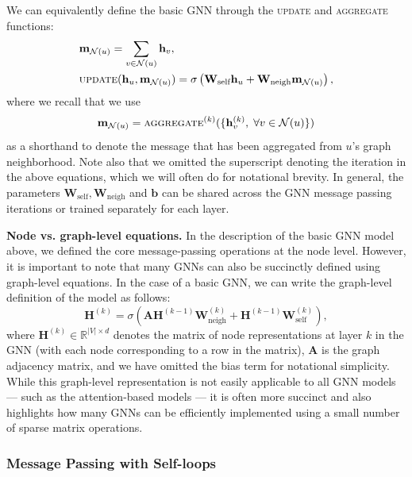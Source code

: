 \documentclass[10pt]{book}
\begin{document}
We can equivalently define the basic GNN through the \textsc{update} and \textsc{aggregate} functions:
\begin{align}
    &\mathbf m_{\mathcal N(u)} = \sum_{v \in \mathcal N(u)} \mathbf h_v, 
    \label{eq:basicgnn} \\
    &\textsc{update}(\mathbf h_u, \mathbf m_{\mathcal N(u)}) = \sigma \left( \mathbf W_\text{self} \mathbf h_u + \mathbf W_\text{neigh} \mathbf m_{\mathcal N(u)} \right),
\end{align}
where we recall that we use
\begin{equation}
    \mathbf m_{\mathcal N(u)} = \textsc{aggregate}^{(k)}(\{ \mathbf h_v^{(k)}, \; \forall v \in \mathcal N(u)\})
\end{equation}
as a shorthand to denote the message that has been aggregated from $u$'s graph neighborhood. Note also that we omitted the superscript denoting the iteration in the above equations, which we will often do for notational brevity. In general, the parameters $\mathbf W_\text{self}, \mathbf W_\text{neigh}$ and $\mathbf b$ can be shared across the GNN message passing iterations or trained separately for each layer.

\textbf{Node vs. graph-level equations.} In the description of the basic GNN model above, we defined the core message-passing operations at the node level. However, it is important to note that many GNNs can also be succinctly defined using graph-level equations. In the case of a basic GNN, we can write the graph-level definition of the model as follows:
\begin{equation}
    \mathbf H^{(k)} = \sigma \left( \mathbf A \mathbf H^{(k-1)} \mathbf W_\text{neigh}^{(k)} + \mathbf H^{(k-1)} \mathbf W_\text{self}^{(k)} \right),
\end{equation}
where $\mathbf H^{(k)} \in \mathbb R^{|V| \times d}$ denotes the matrix of node representations at layer $k$ in the GNN (with each node corresponding to a row in the matrix), $\mathbf A$ is the graph adjacency matrix, and we have omitted the bias term for notational simplicity. While this graph-level representation is not easily applicable to all GNN models --- such as the attention-based models --- it is often more succinct and also highlights how many GNNs can be efficiently implemented using a small number of sparse matrix operations.

\subsubsection{Message Passing with Self-loops}
\end{document}
